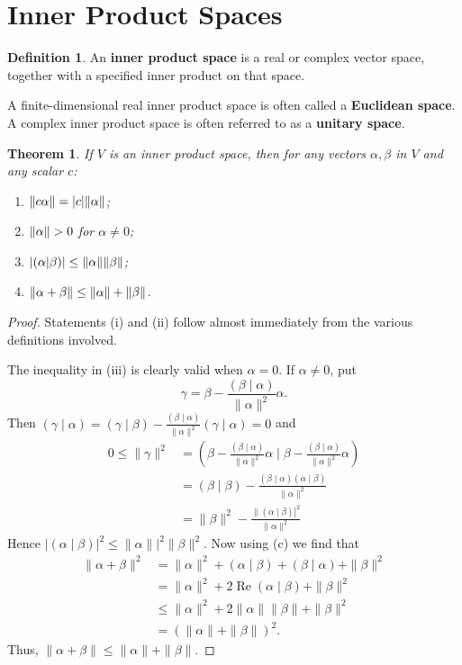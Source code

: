 \documentclass{book}
\newtheorem{thm}{Theorem}[section]
\theoremstyle{remark}
\theoremstyle{definition}
\newtheorem{definition}{Definition}[section]
\begin{document}
\section{Inner Product Spaces}
\begin{definition}
    An \textbf{inner product space} is a real or complex vector space, together with a specified inner product on that space. 
    
    A finite-dimensional real inner product space is often called a \textbf{Euclidean space}. A complex inner product space is often referred to as a \textbf{unitary space}.
\end{definition}

\begin{thm}
    If $V$ is an inner product space, then for any vectors $\alpha, \beta$ in $V$ and any scalar $c$:
    \begin{enumerate}
        \item $\norm{c \alpha} = |c| \norm{\alpha}$;
        \item $\norm{\alpha} > 0$ for $\alpha \neq 0$;
        \item $|(\alpha|\beta)| \leq \norm{\alpha} \norm{\beta}$;
        \item $\norm{\alpha + \beta} \leq \norm{\alpha} + \norm{\beta}$.
    \end{enumerate}
\end{thm}
\begin{proof}
Statements (i) and (ii) follow almost immediately from the various definitions involved. 
    
The inequality in (iii) is clearly valid when $\alpha=0$. If $\alpha \neq 0$, put
$$
\gamma=\beta-\frac{(\beta \mid \alpha)}{\|\alpha\|^2} \alpha .
$$
Then $(\gamma \mid \alpha)=(\gamma \mid \beta) - \frac{(\beta \mid \alpha)}{\|\alpha\|^2} (\gamma \mid \alpha) = 0$ and
$$
\begin{aligned}
0 \leq\|\gamma\|^2 & =\left(\beta-\frac{(\beta \mid \alpha)}{\|\alpha\|^2} \alpha \mid \beta-\frac{(\beta \mid \alpha)}{\|\alpha\|^2} \alpha\right) \\
& =(\beta \mid \beta)-\frac{(\beta \mid \alpha)(\alpha \mid \beta)}{\|\alpha\|^2} \\
& =\|\beta\|^2-\frac{\|\left.(\alpha \mid \beta)\right|^2}{\|\alpha\|^2}
\end{aligned}
$$
Hence $|(\alpha \mid \beta)|^2 \leq\left.\|\alpha\|\right|^2\|\beta\|^2$. 
Now using (c) we find that
$$
\begin{aligned}
\|\alpha+\beta\|^2 & =\|\alpha\|^2+(\alpha \mid \beta)+(\beta \mid \alpha)+\|\beta\|^2 \\
& =\|\alpha\|^2+2 \operatorname{Re}(\alpha \mid \beta)+\|\beta\|^2 \\
& \leq\|\alpha\|^2+2\|\alpha\|\|\beta\|+\|\beta\|^2 \\
& =(\|\alpha\|+\|\beta\|)^2 .
\end{aligned}
$$
Thus, $\|\alpha+\beta\| \leq\|\alpha\|+\|\beta\|$.
\end{proof}
\end{document}
